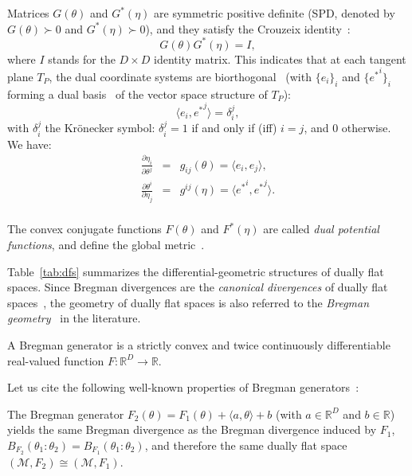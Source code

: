 \documentclass[graybox]{svmult}
\def\inner#1#2{{\langle #1,#2\rangle}}
\def\bbR{\mathbb{R}}
\def\calM{\mathcal{M}}
\begin{document}
Matrices $G(\theta)$ and $G^*(\eta)$ are symmetric positive definite (SPD, denoted by $G(\theta)\succ 0$ and $G^*(\eta)\succ 0$), and 
 they satisfy the Crouzeix identity~\cite{Crouzeix-1977}: 
\begin{equation}
G(\theta)   G^*(\eta) = I,
\end{equation}
where $I$ stands for the $D\times D$ identity matrix.
This indicates that at each tangent plane $T_P$, the dual coordinate systems are biorthogonal~\cite{refduality-2015} (with $\{e_i\}_i$ and
 $\{{e^*}^i\}_i$ forming a dual basis~\cite{tensor-2011} of the vector space structure of $T_P$):
	\begin{equation}
	\inner{e_i}{{e^*}^j}=\delta_i^j,
	\end{equation}
 with $\delta_i^j$ the Kr\"onecker symbol: $\delta_i^j=1$ if and only if (iff) $i=j$, and $0$ otherwise.
We have:
	\begin{eqnarray}
	\frac{\partial \eta_i}{\partial\theta^j}&=&g_{ij}(\theta)=\inner{e_i}{e_j},\\
\frac{\partial \theta^i}{\partial\eta_j}&=&g^{ij}(\eta)=\inner{{e^*}^i}{{e^*}^j}.\\
\end{eqnarray}

	The convex conjugate functions $F(\theta)$ and $F^*(\eta)$ are called {\em dual potential functions}, and define the global metric~\cite{HIG-2007}.
	
	
Table~\ref{tab:dfs} summarizes the differential-geometric structures of dually flat spaces.
Since Bregman divergences are the {\em canonical divergences} of dually flat spaces~\cite{IG-2016}, the geometry of dually flat spaces is also  referred to the {\em Bregman geometry}~\cite{Dawid-2007} in the literature.

\begin{definition} \label{def:bg}
A Bregman generator is a strictly convex and twice continuously differentiable real-valued function $F:\bbR^D \rightarrow \bbR$.
\end{definition}

Let us cite the following well-known properties of Bregman generators~\cite{Bregman-2005}:

\begin{property} \label{prop:bdaffine}
The Bregman generator $F_2(\theta)=F_1(\theta)+\inner{a}{\theta}+b$ (with $a\in\bbR^D$ and $b\in\bbR$) yields the same Bregman divergence as the Bregman divergence induced by $F_1$, $B_{F_2}(\theta_1:\theta_2) =B_{F_1}(\theta_1:\theta_2) $, and therefore the same dually flat space $(\calM,F_2)\cong (\calM,F_1)$.
\end{property}
\end{document}
